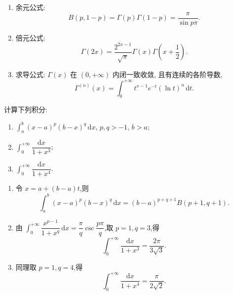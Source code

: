 \begin{proposition}[\markstar]
\begin{enumerate}
        \item 余元公式:
              \[
                  B(p,1-p)=\Gamma(p)\Gamma(1-p)=\dfrac{\pi}{\sin p\pi}.
              \]

        \item 倍元公式:
              \[
                  \Gamma(2x)=\dfrac{2^{2x-1}}{\sqrt{\pi}}\Gamma(x)\Gamma\left(x+\dfrac{1}{2}\right).
              \]

        \item 求导公式: $\Gamma(x)$ 在 $(0,+\infty)$ 内闭一致收敛, 且有连续的各阶导数,
              \[
                  \Gamma^{(n)}(x)=\int_0^{+\infty}t^{x-1}e^{-t}(\ln t)^n\,\mathrm{d}t.
              \]
    \end{enumerate}
\end{proposition}

\begin{example}
    计算下列积分:
    \begin{enumerate}
        \item $\displaystyle\int_a^b(x-a)^p(b-x)^q\,\mathrm{d}x$, $p,q>-1$, $b>a$;
        \item $\displaystyle\int_0^{+\infty}\dfrac{\mathrm{d}x}{1+x^3}$;
        \item $\displaystyle\int_0^{+\infty}\dfrac{\mathrm{d}x}{1+x^4}$.
    \end{enumerate}
\end{example}
\exampleblank

\begin{solution}
    \leavevmode
    \begin{enumerate}
        \item 令 $x=a+(b-a)t$,则
              \[
                  \displaystyle\int_a^b(x-a)^p(b-x)^q\,\mathrm{d}x
                  =(b-a)^{p+q+1}B(p+1,q+1).
              \]
        \item 由 $\displaystyle\int_0^{+\infty}\dfrac{x^{p-1}}{1+x^q}\,\mathrm{d}x
                  =\dfrac{\pi}{q}\csc\dfrac{p\pi}{q}$,取 $p=1,q=3$,得
              \[
                  \displaystyle\int_0^{+\infty}\dfrac{\mathrm{d}x}{1+x^3}
                  =\dfrac{2\pi}{3\sqrt3}.
              \]
        \item 同理取 $p=1,q=4$,得
              \[
                  \displaystyle\int_0^{+\infty}\dfrac{\mathrm{d}x}{1+x^4}
                  =\dfrac{\pi}{2\sqrt2}.
              \]
    \end{enumerate}
\end{solution}

